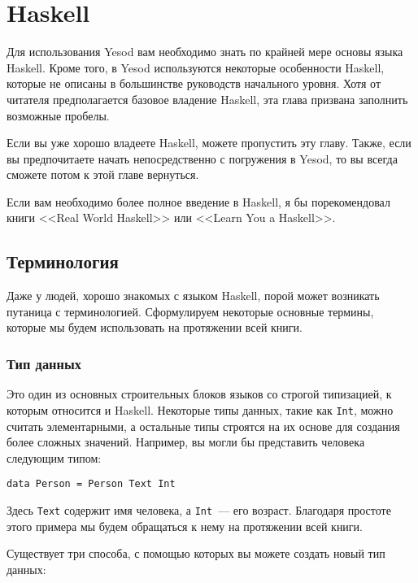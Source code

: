 \chapter{Haskell}

Для использования Yesod вам необходимо знать по крайней мере основы языка
Haskell. Кроме того, в Yesod используются некоторые особенности Haskell,
которые не описаны в большинстве руководств начального уровня. Хотя от читателя
предполагается базовое владение Haskell, эта глава призвана заполнить возможные
пробелы.

Если вы уже хорошо владеете Haskell, можете пропустить эту главу. Также, если
вы предпочитаете начать непосредственно с погружения в Yesod, то вы всегда
сможете потом к этой главе вернуться.

Если вам необходимо более полное введение в Haskell, я бы порекомендовал книги
<<Real World Haskell>> или <<Learn You a Haskell>>.

\section{Терминология}

Даже у людей, хорошо знакомых с языком Haskell, порой может возникать путаница
с терминологией. Сформулируем некоторые основные термины, которые мы будем
использовать на протяжении всей книги.

\subsection{Тип данных}

Это один из основных строительных блоков языков со строгой типизацией, к
которым относится и Haskell. Некоторые типы данных, такие как \lstinline'Int',
можно считать элементарными, а остальные типы строятся на их основе для
создания более сложных значений. Например, вы могли бы представить человека
следующим типом:

\begin{lstlisting}
data Person = Person Text Int
\end{lstlisting}

Здесь \lstinline'Text' содержит имя человека, а \lstinline'Int'~--- его
возраст. Благодаря простоте этого примера мы будем обращаться к нему на
протяжении всей книги.

Существует три способа, с помощью которых вы можете создать новый тип данных:


